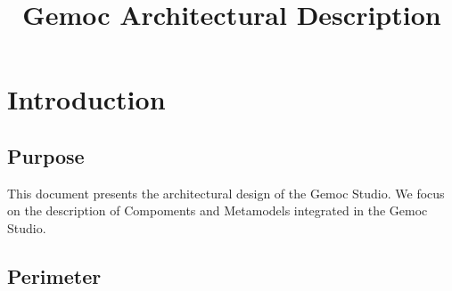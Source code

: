 \documentclass{gemoc} %
\title{Gemoc Architectural Description}
\begin{document}
\maketitle

\begin{revisions}
	\begin{revtable}
		\dates{}{}{}{}{}
		\writers{}{}{}{}{}
		\approvers{}{}{}{}{}
	\end{revtable}
	\begin{revisionlabels}
		\revlabel{}
	\end{revisionlabels}
\end{revisions}

\begin{tableofauthors}
\end{tableofauthors}

\tableofcontents
\newpage

\chapter{Introduction}


\section{Purpose}
This document presents the architectural design of the Gemoc Studio. We focus on 
the description of  Compoments and Metamodels integrated in the Gemoc Studio.

\section{Perimeter}

\end{document}
